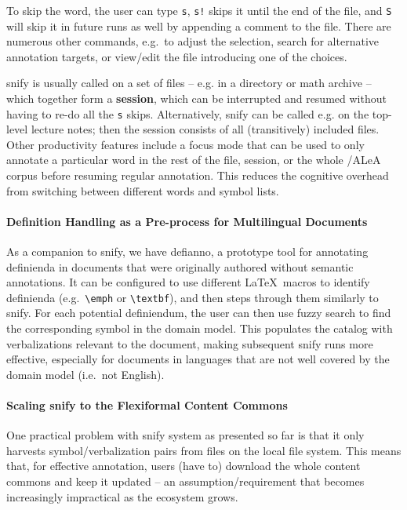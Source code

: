 \documentclass[runningheads]{llncs}
\newcommand\ALeA{\textsf{ALeA}\xspace}
\newcommand\snify{\textsf{snify}\xspace}
\newcommand\defianno{\textsf{defianno}\xspace}
\begin{document}
To skip the word, the user can type \lstinline|s|,
\lstinline|s!| skips it until the end of the file, and \lstinline|S|
will skip it in future runs as well by appending a comment to the file.
There are numerous other commands, e.g.\ to adjust the selection,
search for alternative annotation targets,
or view/edit the file introducing one of the choices.

\snify is usually called on a set of files -- e.g. in a directory or math archive -- which
together form a \textbf{session}, which can be interrupted and resumed without having to
re-do all the \lstinline|s| skips. Alternatively, \snify can be called e.g. on the
top-level lecture notes; then the session consists of all (transitively) included
files. Other productivity features include a focus mode that can be used to only annotate
a particular word in the rest of the file, session, or the whole \sTeX/\ALeA corpus before
resuming regular annotation. This reduces the cognitive overhead from switching between
different words and symbol lists.

\paragraph{Definition Handling as a Pre-process for Multilingual Documents}
As a companion to \snify, we have \defianno, a prototype tool for annotating definienda in
documents that were originally authored without semantic annotations.  It can be
configured to use different \LaTeX\ macros to identify definienda (e.g.\ \lstinline|\emph|
or \lstinline|\textbf|), and then steps through them similarly to \snify.  For each
potential definiendum, the user can then use fuzzy search to find the corresponding symbol
in the domain model.  This populates the catalog with verbalizations relevant to the
document, making subsequent \snify runs more effective, especially for documents in
languages that are not well covered by the domain model (i.e.\ not English).

  \paragraph{Scaling \snify to the Flexiformal Content Commons }
One practical problem with \snify system as presented so far is that it only harvests
symbol/verbalization pairs from \sTeX files on the local file system. This means that, for
effective annotation, users (have to) download the whole content commons and keep it
updated -- an assumption/requirement that becomes increasingly impractical as the \sTeX
ecosystem grows.
\end{document}
